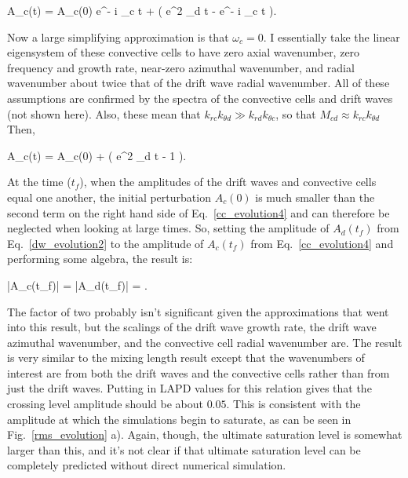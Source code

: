 \beq
\label{cc_evolution3}
A_c(t) = A_c(0) e^{- i \omega_c t} +  \left( e^{2 \gamma_d t} - e^{- i \omega_c t}  \right).
\eeq

Now a large simplifying approximation is that $\omega_c = 0$. I essentially take the linear eigensystem of these convective cells to have zero axial wavenumber, zero frequency and growth rate, 
near-zero azimuthal wavenumber, and radial wavenumber about twice that of the drift wave radial wavenumber. All of these assumptions are confirmed by the spectra of the convective cells and
drift waves (not shown here). Also, these mean that $k_{r c} k_{\theta d} \gg k_{r d} k_{\theta c}$, so that $M_{c d} \approx k_{r c} k_{\theta d}$ Then,

\beq
\label{cc_evolution4}
A_c(t) = A_c(0) +  \left( e^{2 \gamma_d t} - 1  \right).
\eeq

At the time ($t_f$), when the amplitudes of the drift waves and convective cells equal one another, the initial perturbation $A_c(0)$ is much smaller than the second term on the right hand side
of Eq.~\ref{cc_evolution4} and can therefore be neglected when looking at large times. So, setting the amplitude of $A_d(t_f)$ from Eq.~\ref{dw_evolution2} to the amplitude of 
$A_c(t_f)$ from Eq.~\ref{cc_evolution4} and performing some algebra, the result is:

\beq
\label{dw_cc_scaling}
|A_c(t_f)| = |A_d(t_f)| = .
\eeq

The factor of two probably isn't significant given the approximations that went into this result, but the scalings of the drift wave growth rate, the drift wave azimuthal wavenumber,
and the convective cell radial wavenumber are. The result is very similar to the mixing length result except that the wavenumbers of interest are from both the drift waves and the
convective cells rather than from just the drift waves. Putting in LAPD values for this relation gives that the crossing level amplitude should be about $0.05$. This is consistent
with the amplitude at which the simulations begin to saturate, as can be seen in Fig.~\ref{rms_evolution} a). Again, though, the ultimate saturation level is somewhat larger than this,
and it's not clear if that ultimate saturation level can be completely predicted without direct numerical simulation.

